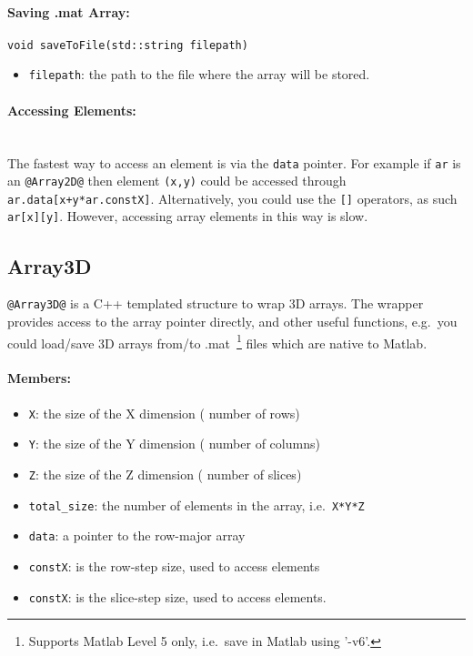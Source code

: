 \documentclass[12pt,letterpaper]{article}
\makeatletter
\def\keyhl[#1]{\lstinline{@#1@}}
\makeatother
\begin{document}
\paragraph{Saving .mat Array:}\hspace{-2ex}
\begin{lstlisting}
void saveToFile(std::string filepath)
\end{lstlisting}
\begin{itemize}
\item \lstinline{filepath}: the path to the file where the array will be stored.
\end{itemize}

\paragraph{Accessing Elements:}\hspace{-2ex}\\
The fastest way to access an element is via the \lstinline{data} pointer. For example if \lstinline{ar} is an \keyhl[Array2D] then element \lstinline{(x,y)} could be accessed through \lstinline{ar.data[x+y*ar.constX]}.
Alternatively, you could use the \lstinline{[]} operators, as such \lstinline{ar[x][y]}. However, accessing array elements in this way is slow.



\subsection{Array3D}
\keyhl[Array3D] is a C++ templated structure to wrap 3D arrays. The wrapper provides access to the array pointer directly, and other useful functions, e.g.~you could load/save 3D arrays from/to .mat~\footnote{Supports Matlab Level 5 only, i.e.~save in Matlab using '-v6'.} files which are native to Matlab.
\paragraph{Members:}\hspace{-2ex}
\begin{itemize}
\item \lstinline{X}: the size of the X dimension ( number of rows)
\item \lstinline{Y}: the size of the Y dimension ( number of columns)
\item \lstinline{Z}: the size of the Z dimension ( number of slices)
\item \lstinline{total_size}: the number of elements in the array, i.e.~\lstinline{X*Y*Z}
\item \lstinline{data}: a pointer to the row-major array
\item \lstinline{constX}: is the row-step size, used to access elements
\item \lstinline{constX}: is the slice-step size, used to access elements.
\end{itemize}
\end{document}

